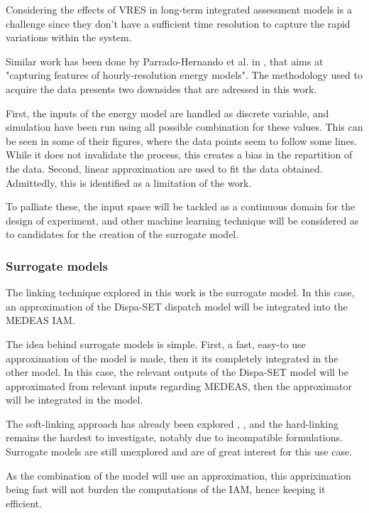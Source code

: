 Considering the effects of VRES in long-term integrated assessment models is a challenge since they don't have a sufficient time resolution to capture the rapid variations within the system.

Similar work has been done by Parrado-Hernando et al. in \cite{Hernando2022}, that aims at "capturing features of hourly-resolution energy models". The methodology used to acquire the data presents two downsides that are adressed in this work.

First, the inputs of the energy model are handled as discrete variable, and simulation have been run using all possible combination for these values. This can be seen in some of their figures, where the data points seem to follow some lines. While it does not invalidate the process, this creates a bias in the repartition of the data. Second, linear approximation are used to fit the data obtained. Admittedly, this is identified as a limitation of the work.

To palliate these, the input space will be tackled as a continuous domain for the design of experiment, and other machine learning technique will be considered as to candidates for the creation of the surrogate model.

\subsubsection{Surrogate models}

The linking technique explored in this work is the surrogate model. In this case, an approximation of the Dispa-SET dispatch model will be integrated into the MEDEAS IAM. 

The idea behind surrogate models is simple. First, a fast, easy-to use approximation of the model is made, then it its completely integrated in the other model. In this case, the relevant outputs of the Dispa-SET model will be approximated from relevant inputs regarding MEDEAS, then the approximator will be integrated in the model.

The soft-linking approach has already been explored \cite{Brinkerink2022-softlink}, \cite{DEane2012-softlink}, and the hard-linking remains the hardest to investigate, notably due to incompatible formulations. Surrogate models are still unexplored and are of great interest for this use case.

As the combination of the model will use an approximation, this appriximation being fast will not burden the computations of the IAM, hence keeping it efficient.

